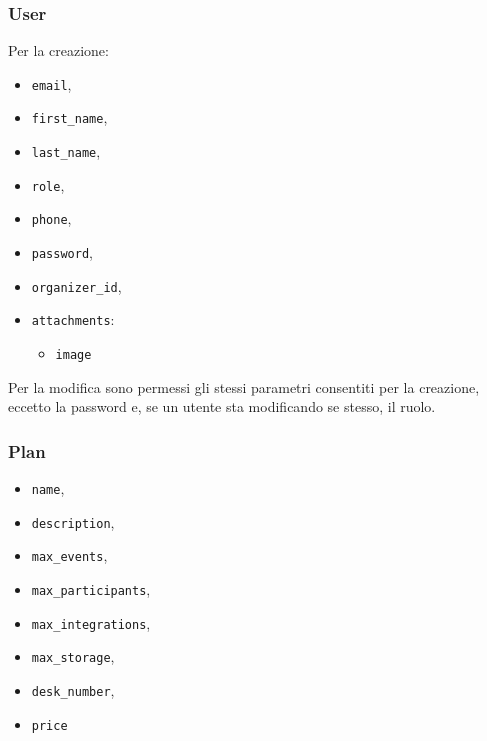 \subsubsection{User}
Per la creazione:
\begin{itemize}
	\item \verb|email|,
    \item \verb|first_name|,
    \item \verb|last_name|,
    \item \verb|role|,
    \item \verb|phone|,
    \item \verb|password|,
    \item \verb|organizer_id|,
	\item \verb|attachments|:
	\begin{itemize}
		\item \verb|image|
	\end{itemize}
\end{itemize}
Per la modifica sono permessi gli stessi parametri consentiti per la creazione, eccetto la password e, se un utente sta modificando se stesso, il ruolo.

\subsubsection{Plan}
\begin{itemize}
	\item \verb|name|,
    \item \verb|description|,
    \item \verb|max_events|,
    \item \verb|max_participants|,
    \item \verb|max_integrations|,
    \item \verb|max_storage|,
    \item \verb|desk_number|,
    \item \verb|price|
\end{itemize}

